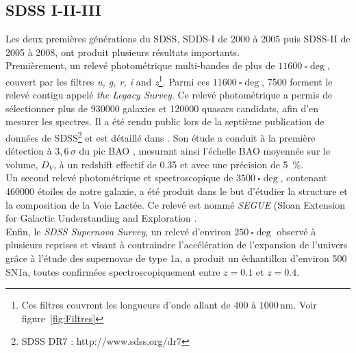 \subsection{SDSS I-II-III}
Les deux premières générations du SDSS, SDDS-I de 2000 à 2005 puis SDSS-II de 2005 à 2008, ont produit plusieurs résultats importants.\\
Premièrement, un relevé photométrique multi-bandes de plus de $\SI{11600}{\square\deg}$, couvert par les filtres \emph{u, g, r, i} and \emph{z}\footnote{Ces filtres couvrent les longueurs d'onde allant de $400$ à $1000\,\mathrm{nm}$. Voir figure~\ref{fig:Filtres}}. Parmi ces $\SI{11600}{\square\deg}$, \num{7500} forment le relevé contigu appelé \emph{the Legacy Survey}. Ce relevé photométrique a permis de sélectionner plus de \num{930000} galaxies et \num{120000} quasars candidats, afin d'en mesurer les spectres. Il a été rendu public lors de la septième publication de données de SDSS\footnote{SDSS DR7 : http://www.sdss.org/dr7} et est détaillé dans \textcite{Abazajian2008}. Son étude a conduit à la première détection à $3,6\,\sigma$ du pic BAO \autocite{Eisenstein2005}, mesurant ainsi l'échelle BAO moyennée sur le volume, $D_V$, à un redshift effectif de \num{0,35} et avec une précision de \SI{5}{\percent}. \\
Un second relevé photométrique et spectroscopique de $\SI{3500}{\square\deg}$, contenant \num{460000} étoiles de notre galaxie, a été produit dans le but d'étudier la structure et la composition de la Voie Lactée. Ce relevé est nommé \emph{SEGUE} (Sloan Extension for Galactic Understanding and Exploration \autocite{Collaboration2009}.\\
Enfin, le \emph{SDSS Supernova Survey}, un relevé d'environ $\SI{250}{\square\deg}$ observé à plusieurs reprises et visant à contraindre l'accélération de l'expansion de l'univers grâce à l'étude des supernovae de type 1a, a produit un échantillon d'environ 500 SN1a, toutes confirmées spectroscopiquement entre $z=\num{0,1}$ et $z=\num{0,4}$.


